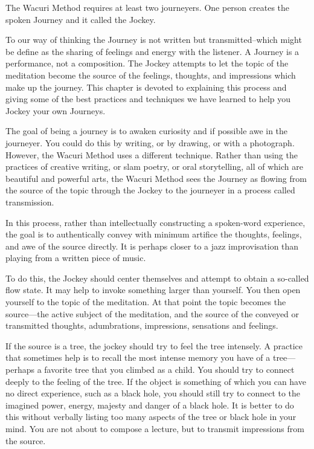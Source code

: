 \documentclass[12pt]{book}
\begin{document}
The Wacuri Method requires at least two journeyers. One person creates the spoken Journey and it called the Jockey.
					
To our way of thinking the Journey is not written but transmitted--which might be define as the sharing of feelings and energy with the listener. A Journey is a performance, not a composition. The Jockey attempts to let the topic of the meditation become the source of the feelings, thoughts, and impressions which make up the journey. This chapter is devoted to explaining this process and giving some of the best practices and techniques we have learned to help you Jockey your own Journeys.
					
The goal of being a journey is to awaken curiosity and if possible awe in the journeyer. You could do this by writing, or by drawing, or with a photograph. However, the Wacuri Method uses a different technique. Rather than using the practices of creative writing, or slam poetry, or oral storytelling, all of which are beautiful and powerful arts, the Wacuri Method sees the Journey as flowing from the source of the topic through the Jockey to the journeyer in a process called transmission.
					
In this process, rather than intellectually constructing a spoken-word experience, the goal is to authentically convey with minimum artifice the thoughts, feelings, and awe of the source directly. It is perhaps closer to a jazz improvisation than playing from a written piece of music.
					
To do this, the Jockey should center themselves and attempt to obtain a so-called flow state. It may help to invoke something larger than yourself. You then open yourself to the topic of the meditation. At that point the topic becomes the source—the active subject of the meditation, and the source of the conveyed or transmitted thoughts, adumbrations, impressions, sensations and feelings.
					
If the source is a tree, the jockey should try to feel the tree intensely. A practice that sometimes help is to recall the most intense memory you have of a tree—perhaps a favorite tree that you climbed as a child. You should try to connect deeply  to the feeling of the tree. If the object is something of which you can have no direct experience, such as a black hole, you should still try to connect to the imagined power, energy, majesty and danger of a black hole. It is better to do this without verbally listing too many aspects of the tree or black hole in your mind. You are not about to compose a lecture, but to transmit impressions from the source.
					
\end{document}
